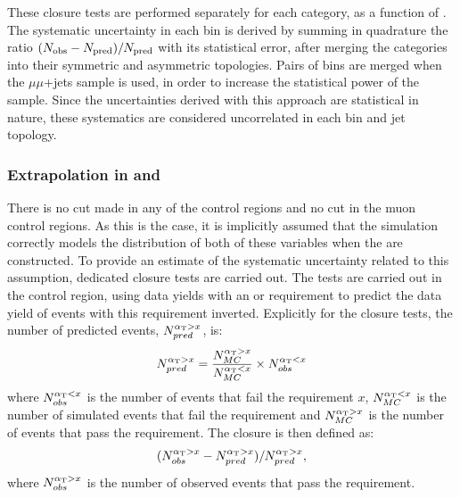 These closure tests are performed separately for each \njet category,
as a function of \HT. The systematic uncertainty in each \HT bin
is derived by summing in quadrature the ratio $(N_{\textrm{obs}} - N_{\textrm{pred}})/N_{\textrm{pred}}$
with its statistical error, after merging the \njet categories into
their symmetric and asymmetric topologies. Pairs of \HT bins are merged
when the $\mu\mu$+jets sample is used, in order to increase the
statistical power of the sample.  Since the uncertainties derived with
this approach are statistical in nature, these systematics are
considered uncorrelated in each \HT bin and jet topology. 

\subsubsection*{Extrapolation in \alphat and \bdphi}
\label{sec:tfSyst_alphaT}

There is no \bdphi cut made in any of the control regions and no
\alphat cut in the muon control regions. As this is the case, it is
implicitly assumed that the simulation correctly models the
distribution of both of these variables when the \TFs are constructed.
To provide an estimate of the systematic uncertainty related to this
assumption, dedicated closure tests are carried out.  
The tests are carried out in the \mj control region, using data yields
with an \alphat or \bdphi requirement to predict the data yield of
events with this requirement inverted. Explicitly for the \alphat
closure tests, the number of
predicted events, $N^{\alpha_{\text{T}}>x}_{pred}$, is: 
\begin{equation}
N^{\alpha_{\text{T}}>x}_{pred} =
\frac{N^{\alpha_{\text{T}}>x}_{MC}}{N^{\alpha_{\text{T}}<x}_{MC}}\times N^{\alpha_{\text{T}}<x}_{obs} 
\end{equation}
where $N^{\alpha_{\text{T}}<x}_{obs}$ is the number of events that fail the
\alphat requirement $x$, $N^{\alpha_{\text{T}}<x}_{MC}$ is the number of simulated
events that fail the requirement and $N^{\alpha_{\text{T}}>x}_{MC}$ is the
number of events that pass the requirement. The closure is then
defined as:
\begin{equation}
(N^{\alpha_{\text{T}}>x}_{obs}-N^{\alpha_{\text{T}}>x}_{pred})/N^{\alpha_{\text{T}}>x}_{pred},
\end{equation}
where $N^{\alpha_{\text{T}}>x}_{obs}$ is the number of observed events that pass
the \alphat requirement.

